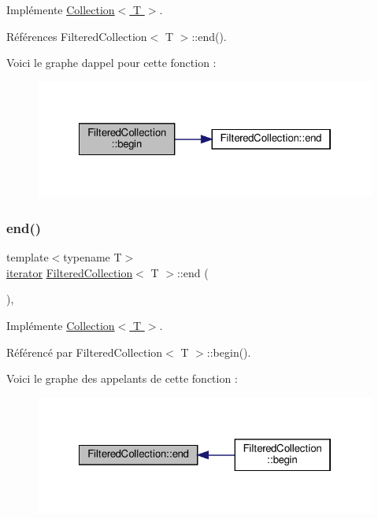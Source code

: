 Implémente \hyperlink{class_collection_a4abc73f8e31a499a22b25d42b7a4fe8c}{Collection$<$ T $>$}.



Références Filtered\+Collection$<$ T $>$\+::end().

Voici le graphe d\textquotesingle{}appel pour cette fonction \+:\nopagebreak
\begin{figure}[H]
\begin{center}
\leavevmode
\includegraphics[width=322pt]{class_filtered_collection_a114f2b1557201e523a264d549926ab0a_cgraph}
\end{center}
\end{figure}
\mbox{\label{class_filtered_collection_ae310c937df5035ef07f7d4de65fca18b}} 
\subsubsection{\texorpdfstring{end()}{end()}}
{\footnotesize\ttfamily template$<$typename T$>$ \\
\hyperlink{class_collection_a317dca4fdf1eb2e47643bb60c620f802}{iterator} \hyperlink{class_filtered_collection}{Filtered\+Collection}$<$ T $>$\+::end (\begin{DoxyParamCaption}{ }\end{DoxyParamCaption})\hspace{0.3cm}{\ttfamily [inline]}, {\ttfamily [virtual]}}



Implémente \hyperlink{class_collection_ab5b98f651d0f49cde1be067c69c52e89}{Collection$<$ T $>$}.



Référencé par Filtered\+Collection$<$ T $>$\+::begin().

Voici le graphe des appelants de cette fonction \+:\nopagebreak
\begin{figure}[H]
\begin{center}
\leavevmode
\includegraphics[width=322pt]{class_filtered_collection_ae310c937df5035ef07f7d4de65fca18b_icgraph}
\end{center}
\end{figure}


